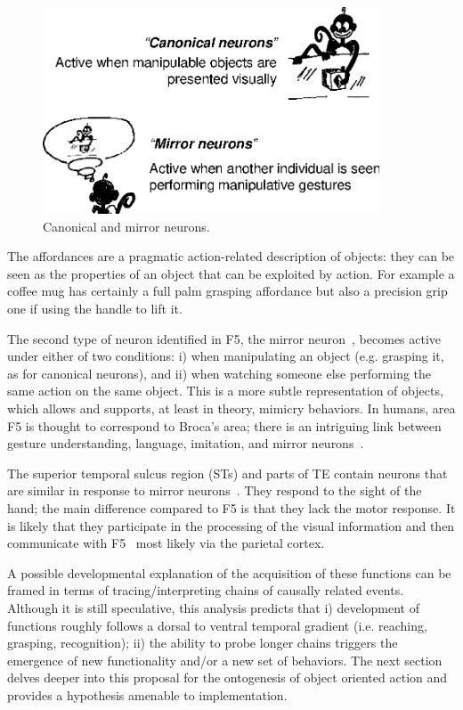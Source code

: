 \ifverbose
\begin{figure}[tbh]
\begin{center}
\includegraphics[width=10cm]{fig-canonical-mirror.eps}
\caption{ 
\label{fig:canonical-mirror}
%
Canonical and mirror neurons.
%
}
\end{center}
\end{figure}
\fi


\ifverbose
%
The affordances are a pragmatic action-related description of objects:
they can be seen as the properties of an object that can be exploited
by action.  For example a coffee mug has certainly a full palm
grasping affordance but also a precision grip one if using the handle
to lift it.
%
\fi

The second type of neuron identified in F5, the mirror neuron~\cite{fadiga00visuomotor}, becomes active under either of two conditions: i)
when manipulating an object (e.g. grasping it, as for canonical neurons), and ii) when watching
someone else performing the same action on the same object. This is a
more subtle representation of objects, which allows and supports, at
least in theory, mimicry behaviors. In humans, area F5 is thought to
correspond to Broca's area; there is an intriguing link between
gesture understanding, language, imitation, and mirror neurons~\cite{rizzolatti98language}.

The superior temporal sulcus region (STs) and parts of TE contain neurons
that are similar in response to mirror neurons~\cite{perret-mistlin-harries-chitty-1990}. 
They respond to the sight of the hand; the main difference compared to F5
is that they lack the motor response. It is likely that they participate in the 
processing of the visual information and then communicate with 
F5~\cite{gallese-fadiga-fogassi-rizzolatti-1996} most likely via the parietal
cortex.

A possible developmental explanation of the acquisition of
these functions can be framed in terms of tracing/interpreting chains 
of causally related events. Although it is still speculative, this analysis 
predicts that i) development of functions roughly follows a dorsal to ventral 
temporal gradient (i.e. reaching, grasping, recognition); ii) the 
ability to probe longer chains triggers the emergence of new functionality 
and/or a new set of behaviors. 
The next section delves deeper into
this proposal for the ontogenesis of object oriented action and
provides a hypothesis amenable to implementation.

